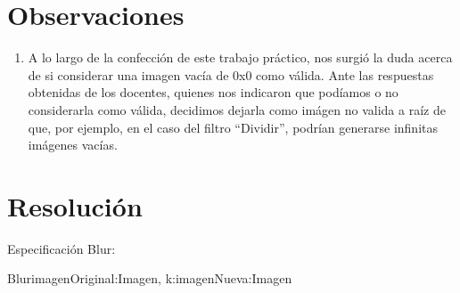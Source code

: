 \documentclass[10pt,a4paper,spanish]{article}
\begin{document}


\maketitle

\newpage


\clearpage

% 

\section{Observaciones}

	\begin{enumerate}
		\item A lo largo de la confección de este trabajo práctico, nos surgió la duda acerca de si considerar una imagen vacía de 0x0 como válida. Ante las respuestas obtenidas de los docentes, quienes nos indicaron que podíamos o no considerarla como válida, decidimos dejarla como imágen no valida a raíz de que, por ejemplo, en el caso del filtro ``Dividir'', podrían generarse infinitas imágenes vacías.
	\end{enumerate}


\section{Resolución}

\begin{ejercicio}
	Especificación Blur:

	\begin{problema}{Blur}{imagenOriginal:Imagen, k:\ent}{imagenNueva:Imagen}
		\asegura{todos([imagenNueva[y][x] == colorPromedioEnPosici\acute{o}n(imagenOriginal,x,y,k) \linebreak | \  x \leftarrow [0..ancho(im)),y \leftarrow [0..alto(im))])}
	\end{problema}

\end{ejercicio}
\end{document}
